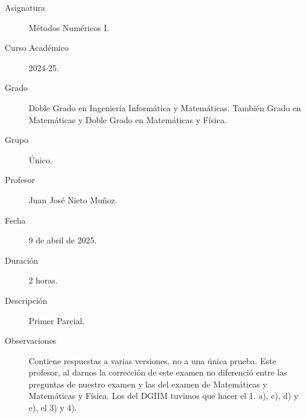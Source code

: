 \documentclass[12pt]{article}
\begin{document}
	
	
	
	
	
	\begin{description}
		\item[Asignatura] Métodos Numéricos I.
		\item[Curso Académico] 2024-25.
		\item[Grado] Doble Grado en Ingeniería Informática y Matemáticas. También Grado en Matemáticas y Doble Grado en Matemáticas y Física.
		\item[Grupo] Único.
		\item[Profesor] Juan José Nieto Muñoz.
		\item[Fecha] 9 de abril de 2025.
		\item[Duración] 2 horas.
		\item[Descripción] Primer Parcial.
		\item[Observaciones] 
		Contiene respuestas a varias versiones, no a una única prueba. Este profesor, al darnos la corrección de este examen no diferenció entre las preguntas de nuestro examen y las del examen de Matemáticas y Matemáticas y Física. Los del DGIIM tuvimos que hacer el 1. a), c), d) y e), el 3) y 4).
	\end{description}
	\newpage
	
\end{document}
